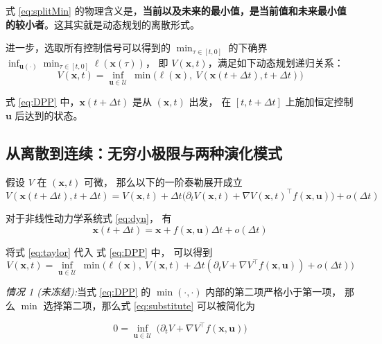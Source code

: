 \documentclass[11pt]{ctexrep}
\begin{document}
式 \ref{eq:splitMin} 的物理含义是，\textbf{当前以及未来的最小值，是当前值和未来最小值的较小者}。这其实就是动态规划的离散形式。


进一步，选取所有控制信号可以得到的 $\min_{\tau\in[t,0]}$ 的下确界 $\inf_{\mathbf{u(\cdot)}}  \min_{\tau\in[t,0]} \ell(\mathbf{x}(\tau))$，
即 $V(\mathbf{x},t)$，满足如下动态规划递归关系：
\begin{equation}\label{eq:DPP}
    V(\mathbf{x},t)
    =
    \inf_{\mathbf{u}\in\mathcal U}\ 
    \min\Big(\ell(\mathbf{x}),\ V(\mathbf{x}(t+\Delta t),t+\Delta t)\Big)  
\end{equation}
 
式 \ref{eq:DPP} 中，$\mathbf{x}(t+\Delta t)$ 是从 $(\mathbf{x},t)$ 出发，
在 $[t,t+\Delta t]$ 上施加恒定控制 $\mathbf{u}$ 后达到的状态。

\subsection{从离散到连续：无穷小极限与两种演化模式}
假设 $V$ 在 $(\mathbf{x},t)$ 可微， 那么以下的一阶泰勒展开成立
\begin{equation}\label{eq:taylor}
    V(\mathbf{x}(t+\Delta t),t+\Delta t)
    =
    V(\mathbf{x},t)
    +\Delta t\Big(\partial_t V(\mathbf{x},t)+\nabla V(\mathbf{x},t)^\top f(\mathbf{x},\mathbf{u})\Big)
    +o(\Delta t)
\end{equation}

对于非线性动力学系统式 \ref{eq:dyn}， 有
\begin{equation}\label{eq:flow}
    \mathbf{x}(t+\Delta t)=\mathbf{x}+f(\mathbf{x},\mathbf{u})\Delta t+o(\Delta t)  
\end{equation}

将式 \ref{eq:taylor} 代入 式 \ref{eq:DPP} 中， 可以得到
\begin{equation}\label{eq:substitute}
    V(\mathbf{x},t)
    =
    \inf_{\mathbf{u}\in\mathcal U}\ 
    \min\Big(\ell(\mathbf{x}),\ V(\mathbf{x},t)+\Delta t(\partial_t V+\nabla V^\top f(\mathbf{x},\mathbf{u}))+o(\Delta t)\Big)
\end{equation}


\emph{情况 1 (未冻结):}当式 \ref{eq:DPP} 的 $\min(\cdot, \cdot)$ 内部的第二项严格小于第一项，
那么 $\min$ 选择第二项，那么式 \ref{eq:substitute} 可以被简化为

\begin{equation}\label{eq:unfrozen}
    0
    =
    \inf_{\mathbf{u}\in\mathcal U}\ 
    \Big(\partial_t V+\nabla V^\top f(\mathbf{x},\mathbf{u})\Big)
\end{equation}
\end{document}

